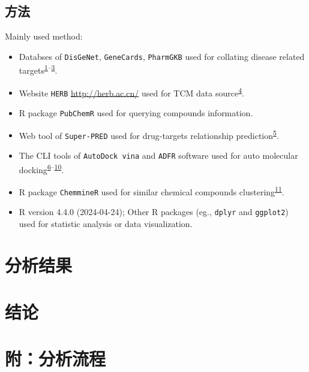 \documentclass[
]{article}
\providecommand{\tightlist}{%
  \setlength{\itemsep}{0pt}\setlength{\parskip}{0pt}}
\begin{document}
\hypertarget{ux65b9ux6cd5}{%
\subsection{方法}\label{ux65b9ux6cd5}}

Mainly used method:

\begin{itemize}
\tightlist
\item
  Databses of \texttt{DisGeNet}, \texttt{GeneCards}, \texttt{PharmGKB} used for collating disease related targets\textsuperscript{\protect\hyperlink{ref-TheDisgenetKnPinero2019}{1}--\protect\hyperlink{ref-PharmgkbAWorBarbar2018}{3}}.
\item
  Website \texttt{HERB} \url{http://herb.ac.cn/} used for TCM data source\textsuperscript{\protect\hyperlink{ref-HerbAHighThFang2021}{4}}.
\item
  R package \texttt{PubChemR} used for querying compounds information.
\item
  Web tool of \texttt{Super-PRED} used for drug-targets relationship prediction\textsuperscript{\protect\hyperlink{ref-SuperpredUpdaNickel2014}{5}}.
\item
  The CLI tools of \texttt{AutoDock\ vina} and \texttt{ADFR} software used for auto molecular docking\textsuperscript{\protect\hyperlink{ref-AutodockVina1Eberha2021}{6}--\protect\hyperlink{ref-AutodockfrAdvRavind2015}{10}}.
\item
  R package \texttt{ChemmineR} used for similar chemical compounds clustering\textsuperscript{\protect\hyperlink{ref-ChemminerACoCaoY2008}{11}}.
\item
  R version 4.4.0 (2024-04-24); Other R packages (eg., \texttt{dplyr} and \texttt{ggplot2}) used for statistic analysis or data visualization.
\end{itemize}

\hypertarget{results}{%
\section{分析结果}\label{results}}

\hypertarget{dis}{%
\section{结论}\label{dis}}

\hypertarget{workflow}{%
\section{附：分析流程}\label{workflow}}
\end{document}
